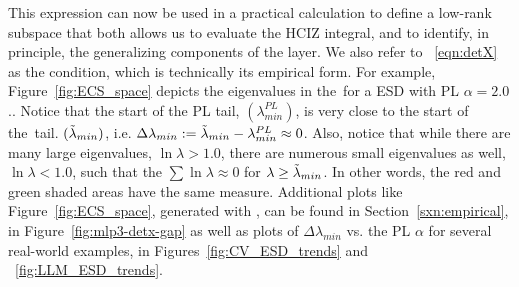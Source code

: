This expression can now be used in a practical calculation to define a low-rank subspace that both allows us to evaluate the HCIZ integral,
and to identify, in principle, the generalizing components of the layer.
We also refer to \EQN~\ref{eqn:detX} as the \TRACELOG condition, which is technically its empirical form.
For example, Figure~\ref{fig:ECS_space} depicts the eigenvalues in the~\ECS for a \Typical ESD with PL $\alpha=2.0$..
Notice that the start of the PL tail, $(\lambda_{min}^{PL})$, is very close to the start of the~\ECS tail. $({\tilde{\lambda}_{min}})$,
i.e. $\Delta \lambda_{min}:={\tilde{\lambda}_{min}}-\lambda^{PL}_{min}\approx 0$.
Also, notice that while there are many large eigenvalues, $\ln\lambda>1.0$, there are numerous small eigenvalues as well,
$\ln\lambda<1.0$, such that the $\sum\ln\lambda\approx 0$ for $\lambda\ge{\tilde{\lambda}_{min}}$. In other words, the red and green shaded areas have the same measure.
Additional plots like Figure~\ref{fig:ECS_space}, generated with \WW,  can be found in Section~\ref{sxn:empirical},
in Figure~\ref{fig:mlp3-detx-gap}
as well as plots of $\Delta \lambda_{min}$ vs. the \WW PL $\alpha$ for several real-world examples,
in Figures~\ref{fig:CV_ESD_trends} and ~\ref{fig:LLM_ESD_trends}.

